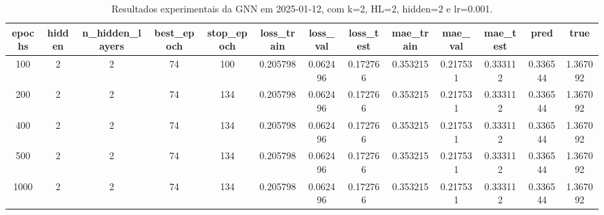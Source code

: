 \begin{table}[h]
\centering
\caption{Resultados experimentais da GNN em 2025-01-12, com k=2, HL=2, hidden=2 e lr=0.001.}
\label{tab:gnn_results_k2_hl2_h2_d20250112}
\begin{tabular}{ccccccccccccc}
\toprule
epochs & hidden & n\_hidden\_layers & best\_epoch & stop\_epoch & loss\_train & loss\_val & loss\_test & mae\_train & mae\_val & mae\_test & pred & true \\
\midrule
100 & 2 & 2 & 74 & 100 & 0.205798 & 0.062496 & 0.172766 & 0.353215 & 0.217531 & 0.333112 & 0.336544 & 1.367092 \\
200 & 2 & 2 & 74 & 134 & 0.205798 & 0.062496 & 0.172766 & 0.353215 & 0.217531 & 0.333112 & 0.336544 & 1.367092 \\
400 & 2 & 2 & 74 & 134 & 0.205798 & 0.062496 & 0.172766 & 0.353215 & 0.217531 & 0.333112 & 0.336544 & 1.367092 \\
500 & 2 & 2 & 74 & 134 & 0.205798 & 0.062496 & 0.172766 & 0.353215 & 0.217531 & 0.333112 & 0.336544 & 1.367092 \\
1000 & 2 & 2 & 74 & 134 & 0.205798 & 0.062496 & 0.172766 & 0.353215 & 0.217531 & 0.333112 & 0.336544 & 1.367092 \\
\bottomrule
\end{tabular}
\end{table}
